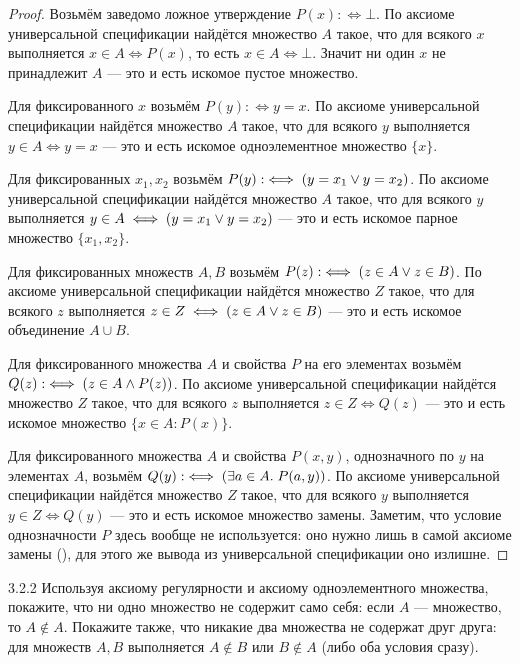 \begin{proof}
 Возьмём заведомо ложное утверждение $P(x) :\iff \bot$. По
аксиоме универсальной спецификации найдётся множество $A$ такое, что для всякого $x$
выполняется $x \in A \iff P(x)$, то есть $x \in A \iff \bot$. Значит ни один $x$ не
принадлежит $A$ — это и есть искомое пустое множество.

 Для фиксированного $x$ возьмём $P(y) :\iff y = x$.
По аксиоме универсальной спецификации найдётся множество $A$ такое, что для всякого $y$
выполняется $y \in A \iff y = x$ — это и есть искомое одноэлементное множество $\{x\}$.

 Для фиксированных $x_1,x_2$ возьмём
$P(y) :\iff \nosplit{(y = x_1 \lor y = x_2)}$. По аксиоме универсальной спецификации найдётся
множество $A$ такое, что для всякого $y$ выполняется
$y \in A \iff \nosplit{(y = x_1 \lor y = x_2)}$ — это и есть искомое парное множество
$\{x_1,x_2\}$.

 Для фиксированных множеств $A,B$ возьмём
$P(z) :\iff \nosplit{(z \in A \lor z \in B)}$. По аксиоме универсальной спецификации найдётся
множество $Z$ такое, что для всякого $z$ выполняется
$z \in Z \iff \nosplit{(z \in A \lor z \in B)}$ — это и есть искомое объединение $A \cup B$.

 Для фиксированного множества $A$ и свойства $P$ на его элементах
возьмём $Q(z) :\iff \nosplit{(z \in A \land P(z))}$. По аксиоме универсальной спецификации
найдётся множество $Z$ такое, что для всякого $z$ выполняется $z \in Z \iff Q(z)$ — это и
есть искомое множество $\{x \in A : P(x)\}$.

 Для фиксированного множества $A$ и свойства $P(x,y)$, однозначного по
$y$ на элементах $A$, возьмём $Q(y) :\iff \nosplit{(\exists a \in A.\; P(a,y))}$. По аксиоме
универсальной спецификации найдётся множество $Z$ такое, что для всякого $y$ выполняется
$y \in Z \iff Q(y)$ — это и есть искомое множество замены. Заметим, что условие
однозначности $P$ здесь вообще не используется: оно нужно лишь в самой аксиоме замены
(), для этого же вывода из универсальной спецификации оно
излишне.
\end{proof}

\begin{exercise}{3.2.2}{}
Используя аксиому регулярности и аксиому одноэлементного множества, покажите, что ни одно
множество не содержит само себя: если $A$ — множество, то $A \notin A$. Покажите также, что
никакие два множества не содержат друг друга: для множеств $A,B$ выполняется $A \notin B$ или
$B \notin A$ (либо оба условия сразу).
\end{exercise}

